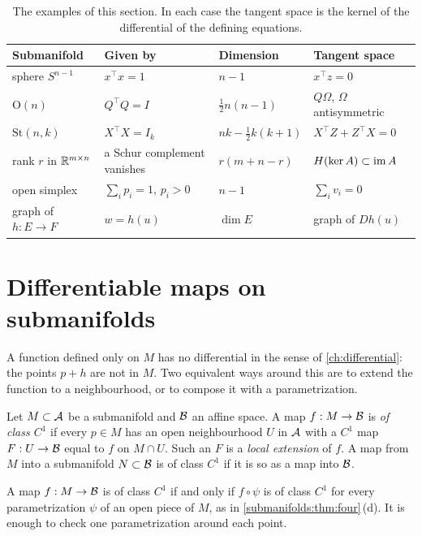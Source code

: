 \begin{notechapter}
\begin{table}[ht]
\centering
\small
\begin{tabular}{@{}llll@{}}
\toprule
Submanifold & Given by & Dimension & Tangent space \\
\midrule
sphere $S^{n-1}$ & $x^\top x = 1$ & $n - 1$ & $x^\top z = 0$ \\
$\mathrm O(n)$ & $Q^\top Q = I$ & $\frac12n(n - 1)$
  & $Q\Omega$, $\Omega$ antisymmetric \\
$\mathrm{St}(n, k)$ & $X^\top X = I_k$ & $nk - \frac12k(k + 1)$
  & $X^\top Z + Z^\top X = 0$ \\
rank $r$ in $\mathbb{R}^{m\times n}$ & a Schur complement vanishes
  & $r(m + n - r)$ & $H(\ker A)\subset\operatorname{im} A$ \\
open simplex & $\sum_ip_i = 1$, $p_i > 0$ & $n - 1$
  & $\sum_iv_i = 0$ \\
graph of $h:E\to F$ & $w = h(u)$ & $\dim E$ & graph of $Dh(u)$ \\
\bottomrule
\end{tabular}
\caption{The examples of this section. In each case the tangent space is
the kernel of the differential of the defining equations.}
\label{submanifolds:tab:examples}
\end{table}

\section{Differentiable maps on submanifolds}\label{submanifolds:sec:maps}

A function defined only on $M$ has no differential in the sense of
\cref{ch:differential}: the points $p + h$ are not in $M$. Two equivalent
ways around this are to extend the function to a neighbourhood, or to
compose it with a parametrization.

\begin{definition}\label{submanifolds:def:c1}
Let $M\subset\mathcal{A}$ be a submanifold and $\mathcal{B}$ an affine space. A map
$f:M\to\mathcal{B}$ is \emph{of class $C^1$} if every $p\in M$ has an open
neighbourhood $U$ in $\mathcal{A}$ with a $C^1$ map $F:U\to\mathcal{B}$ equal to $f$ on
$M\cap U$. Such an $F$ is a \emph{local extension} of $f$. A map from $M$
into a submanifold $N\subset\mathcal{B}$ is of class $C^1$ if it is so as a map
into $\mathcal{B}$.
\end{definition}

\begin{proposition}\label{submanifolds:prop:charts}
A map $f:M\to\mathcal{B}$ is of class $C^1$ if and only if $f\circ\psi$ is of
class $C^1$ for every parametrization $\psi$ of an open piece of $M$, as
in \cref{submanifolds:thm:four}\,(d). It is enough to check one
parametrization around each point.
\end{proposition}


\end{notechapter}
